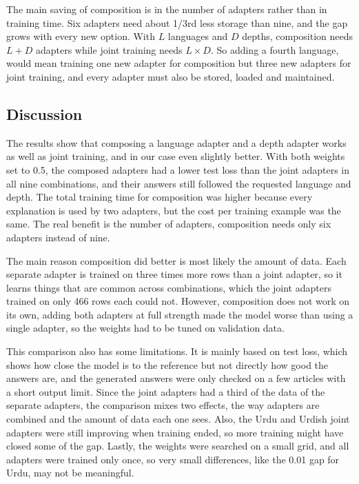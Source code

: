\documentclass{FastFyp}
\begin{document}
The main saving of composition is in the number of adapters rather than in training time. Six adapters need about 1/3rd less storage than nine, and the gap grows with every new option. With $L$ languages and $D$ depths, composition needs $L + D$ adapters while joint training needs $L \times D$. So adding a fourth language, would mean training one new adapter for composition but three new adapters for joint training, and every adapter must also be stored, loaded and maintained.

\subsection{Discussion}
The results show that composing a language adapter and a depth adapter works as well as joint training, and in our case even slightly better. With both weights set to 0.5, the composed adapters had a lower test loss than the joint adapters in all nine combinations, and their answers still followed the requested language and depth. The total training time for composition was higher because every explanation is used by two adapters, but the cost per training example was the same. The real benefit is the number of adapters, composition needs only six adapters instead of nine.

The main reason composition did better is most likely the amount of data. Each separate adapter is trained on three times more rows than a joint adapter, so it learns things that are common across combinations, which the joint adapters trained on only 466 rows each could not. However, composition does not work on its own, adding both adapters at full strength made the model worse than using a single adapter, so the weights had to be tuned on validation data.

This comparison also has some limitations. It is mainly based on test loss, which shows how close the model is to the reference but not directly how good the answers are, and the generated answers were only checked on a few articles with a short output limit. Since the joint adapters had a third of the data of the separate adapters, the comparison mixes two effects, the way adapters are combined and the amount of data each one sees. Also, the Urdu and Urdish joint adapters were still improving when training ended, so more training might have closed some of the gap. Lastly, the weights were searched on a small grid, and all adapters were trained only once, so very small differences, like the 0.01 gap for Urdu, may not be meaningful.
\end{document}
